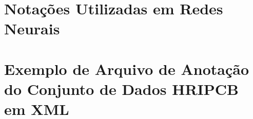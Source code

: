 \chapter{Notações Utilizadas em Redes Neurais} \label{apendice:notacao}


\chapter{Exemplo de Arquivo de Anotação do Conjunto de Dados HRIPCB em XML} \label{apendice:hripcb-xml}


